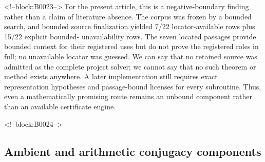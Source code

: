 \documentclass[11pt]{article}
\begin{document}
<!--block:B0023-->
For the present article, this is a negative-boundary finding rather than a claim of
literature absence. The corpus was frozen by a bounded search, and bounded source
finalization yielded 7/22 locator-available rows plus 15/22 explicit bounded-
unavailability rows. The seven located passages provide bounded context for their
registered uses but do not prove the registered roles in full; no unavailable
locator was guessed. We can say that no retained source was
admitted as the complete project solver; we cannot say that no such theorem or
method exists anywhere. A later implementation still requires exact representation
hypotheses and passage-bound licenses for every subroutine. Thus, even a
mathematically promising route remains an unbound component rather than an
available certificate engine.

<!--block:B0024-->
\hypertarget{22-ambient-and-arithmetic-conjugacy-components}{%
\subsection{Ambient and arithmetic conjugacy
components}\label{22-ambient-and-arithmetic-conjugacy-components}}
\end{document}

